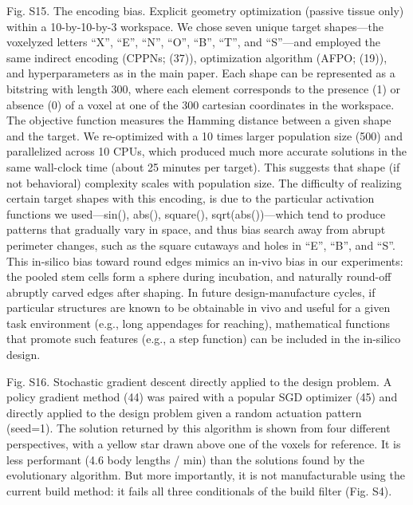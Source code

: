 Fig. S15.  The encoding bias. Explicit geometry optimization (passive tissue only) within a 10-by-10-by-3 workspace. We chose seven unique target shapes---the voxelyzed letters ``X'', ``E'', ``N'', ``O'', ``B'', ``T'', and ``S''---and employed the same indirect encoding (CPPNs; (37)), optimization algorithm (AFPO; (19)), and hyperparameters as in the main paper. Each shape can be represented as a bitstring with length 300, where each element corresponds to the presence (1) or absence (0) of a voxel at one of the 300 cartesian coordinates in the workspace. The objective function measures the Hamming distance between a given shape and the target. 
We re-optimized with a 10 times larger population size (500) and parallelized across 10 CPUs, which produced much more accurate solutions in the same wall-clock time (about 25 minutes per target). This suggests that shape (if not behavioral) complexity scales with population size.
The difficulty of realizing certain target shapes with this encoding, is due to the particular activation functions we used---sin(), abs(), square(), sqrt(abs())---which tend to produce patterns that gradually vary in space, and thus bias search away from abrupt perimeter changes, such as the square cutaways and holes in ``E'', ``B'', and ``S''. This in-silico bias toward round edges mimics an in-vivo bias in our experiments: the pooled stem cells form a sphere during incubation, and naturally round-off abruptly carved edges after shaping.
In future design-manufacture cycles, if particular structures are known to be obtainable in vivo and useful for a given task environment (e.g., long appendages for reaching), mathematical functions that promote such features (e.g., a step function) can be included in the in-silico design.



Fig. S16.  Stochastic gradient descent directly applied to the design problem. A policy gradient method (44) was paired with a popular SGD optimizer (45) and directly applied to the design problem given a random actuation pattern (seed=1). The solution returned by this algorithm is shown from four different perspectives, with a yellow star drawn above one of the voxels for reference. It is less performant (4.6 body lengths / min) than the solutions found by the evolutionary algorithm. But more importantly, it is not manufacturable using the current build method: it fails all three conditionals of the build filter (Fig. S4).
 
